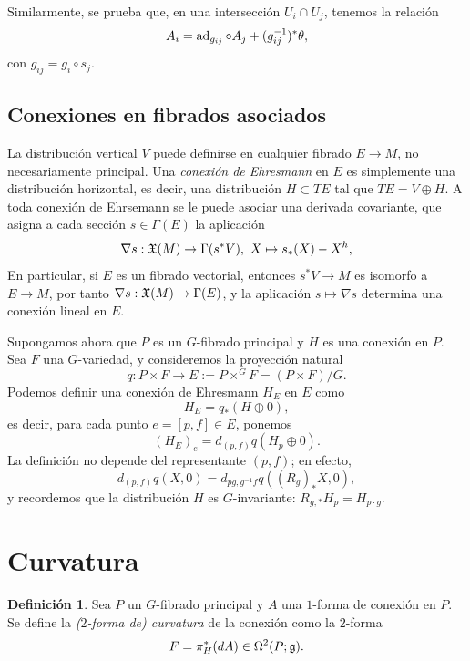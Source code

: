 \documentclass[11pt,a4paper]{amsbook}
\theoremstyle{remark} \newtheorem{rmk}[subsection]{Observación}
\theoremstyle{definition} \newtheorem{defn}[subsection]{Definición}
\theoremstyle{definition} \newtheorem{ex}[subsection]{Ejemplo}
\theoremstyle{definition} \newtheorem{ej}[subsection]{Ejercicio}
\begin{document}
Similarmente, se prueba que, en una intersección $U_i\cap U_j$, tenemos la relación
\begin{equation*}
A_{i} = \operatorname{ad}_{g_{ij}} \circ A_j + (g_{ij}^{-1})^* \theta,
\end{equation*}
con $g_{ij}=g_i \circ s_j$.


\subsection{Conexiones en fibrados asociados}
La distribución vertical $V$ puede definirse en cualquier fibrado $E\rightarrow M$, no necesariamente principal. Una \emph{conexión de Ehresmann} en $E$ es simplemente una distribución horizontal, es decir, una distribución $H\subset TE$ tal que $TE=V\oplus H$. A toda conexión de Ehrsemann se le puede asociar una derivada covariante, que asigna a cada sección $s\in \Gamma(E)$ la aplicación
\begin{equation*}
\nabla s: \mathfrak X(M) \rightarrow \Gamma(s^* V), \ X \mapsto s_*(X) - X^h,
\end{equation*}
En particular, si $E$ es un fibrado vectorial, entonces $s^*V\rightarrow M$ es isomorfo a $E\rightarrow M$, por tanto $\nabla s: \mathfrak X(M)\rightarrow \Gamma(E)$, y la aplicación $s\mapsto \nabla s$ determina una conexión lineal en $E$.

Supongamos ahora que $P$ es un $G$-fibrado principal y $H$ es una conexión en $P$. Sea $F$ una $G$-variedad, y consideremos la proyección natural
\begin{equation*}
q: P \times F \rightarrow E:= P \times^G F = (P\times F)/G.
\end{equation*}
Podemos definir una conexión de Ehresmann $H_E$ en $E$ como
\begin{equation*}
H_E= q_*(H \oplus 0),
\end{equation*}
es decir, para cada punto $e=[p,f]\in E$, ponemos
\begin{equation*}
(H_{E})_e = d_{(p,f)} q (H_p \oplus 0).
\end{equation*}
La definición no depende del representante $(p,f)$; en efecto,
\begin{equation*}
d_{(p,f)} q (X,0) = d_{pg, g^{-1} f} q ((R_g)_* X,0),
\end{equation*}
y recordemos que la distribución $H$ es $G$-invariante: $R_{g,*} H_p = H_{p\cdot g}$.

\section{Curvatura}
\begin{defn}
  Sea $P$ un $G$-fibrado principal y $A$ una $1$-forma de conexión en $P$. Se define la \emph{($2$-forma de) curvatura} de la conexión como la $2$-forma
  \begin{equation*}
F = \pi_H^* (dA) \in \Omega^2(P;\mathfrak{g}).
  \end{equation*}

\end{defn}
\end{document}

